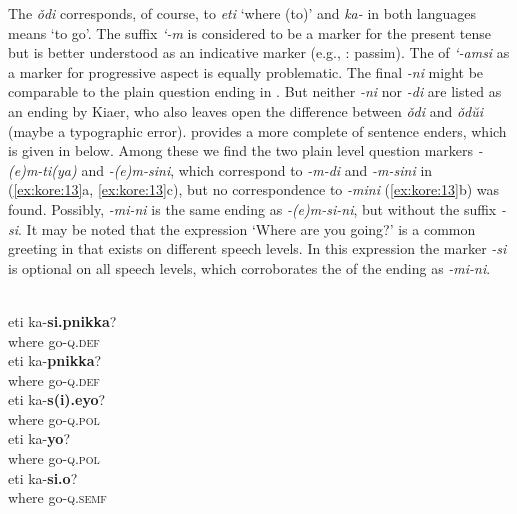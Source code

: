 \noindent The  \textit{ǒdi} corresponds, of course, to  \textit{eti} ‘where (to)’ and \textit{ka-} in both languages means ‘to go’. The suffix \textit{‘-m} is considered to be a marker for the present tense but is better understood as an indicative marker (e.g., \citealt{Saltzman2014}: passim). The  of \textit{‘-amsi} as a marker for progressive aspect is equally problematic. The final \textit{-ni} might be comparable to the plain question ending in . But neither \textit{-ni} nor \textit{-di} are listed as an  ending by Kiaer, who also leaves open the difference between \textit{ǒdi} and \textit{ǒdŭi} (maybe a typographic error). \citet{Sohn1999} provides a more complete  of   sentence enders, which is given in  below. Among these we find the two plain level question markers \textit{-(e)m-ti(ya)} and \textit{-(e)m-sini}, which correspond to \textit{-m-di} and \textit{-m-sini} in (\ref{ex:kore:13}a, \ref{ex:kore:13}c), but no correspondence to \textit{-mini} (\ref{ex:kore:13}b) was found. Possibly, \textit{-mi-ni} is the same ending as \textit{-(e)m-si-ni}, but without the suffix \textit{-si}. It may be noted that the expression ‘Where are you going?’ is a common greeting in  that exists on different speech levels. In this expression the marker \textit{-si} is optional on all speech levels, which corroborates the  of the  ending as \textit{-mi-ni}.

\ea%
    \label{ex:kore:14}
    \\
    \ea
    \gll eti  ka-\textbf{{si.pnikka}}?\\
    where  go-\textsc{q}.\textsc{def}\\

    \ex
    \gll eti  ka-\textbf{{pnikka}}?\\
    where  go-\textsc{q}.\textsc{def}\\
    
    \ex
    \gll eti  ka-\textbf{{s(i).eyo}}?\\
    where  go-\textsc{q}.\textsc{pol}\\
    
    \ex
    \gll eti  ka-\textbf{{yo}}?\\
    where  go-\textsc{q}.\textsc{pol}\\
    
    \ex
    \gll eti  ka-\textbf{{si.o}}?\\
    where  go-\textsc{q}.\textsc{semf}\\
    
